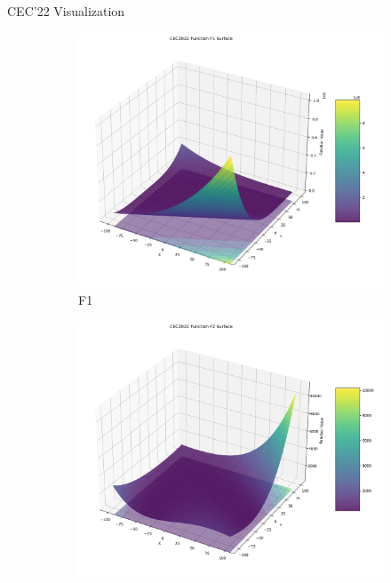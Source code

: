 \documentclass[aspectratio=169]{beamer}
\begin{document}
\begin{frame}{CEC'22 Visualization}
    \centering
    \begin{figure}
        \centering
        \begin{subfigure}[b]{0.19\textwidth}
            \includegraphics[width=\textwidth]{plots/cec_bench/function_surface_f1.png}
            \caption*{F1}
        \end{subfigure}
        \hfill
        \begin{subfigure}[b]{0.19\textwidth}
            \includegraphics[width=\textwidth]{plots/cec_bench/function_surface_f2.png}

\end{subfigure}
\end{figure}
\end{frame}
\end{document}
